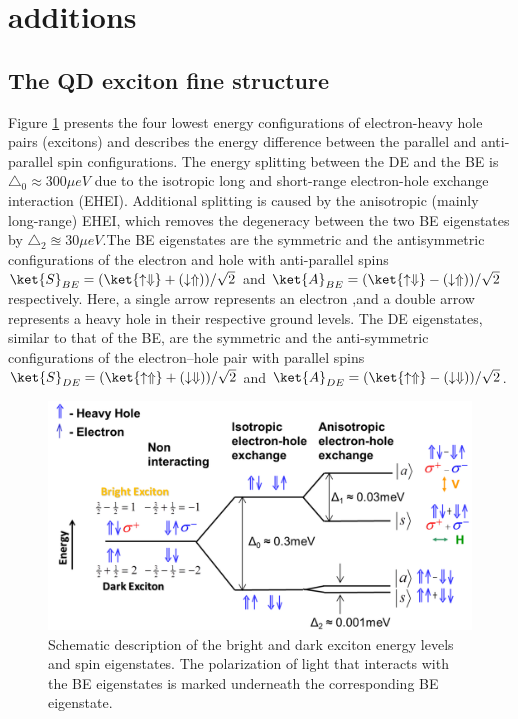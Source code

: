 \section{additions}
\subsection{The QD exciton fine structure}
Figure \ref{fig:energy_structure}  presents the four lowest energy configurations of electron-heavy hole pairs (excitons) and describes the energy difference between the parallel and anti-parallel spin configurations. The energy splitting between the DE and the BE is $\triangle_0 \approx 300 \mu eV$ due to the isotropic long and short-range electron-hole exchange interaction (EHEI). Additional splitting is caused by the anisotropic (mainly long-range) EHEI, which removes the degeneracy between the two BE eigenstates by $\triangle_2 \approxeq 30 \mu eV $.The BE eigenstates are the symmetric and the antisymmetric configurations of the electron and hole with anti-parallel spins $ \ket{S}_{BE} = (\ket{\uparrow\Downarrow}+(\downarrow\Uparrow))/\sqrt{2}$ and  $ \ket{A}_{BE} = (\ket{\uparrow\Downarrow}-(\downarrow\Uparrow))/\sqrt{2}$ respectively. Here, a single arrow represents an electron ,and a double arrow represents a heavy hole in their respective ground levels. The DE eigenstates, similar to that of the BE, are the symmetric and the anti-symmetric configurations of the electron–hole pair with parallel spins $ \ket{S}_{DE} = (\ket{\uparrow\Uparrow}+(\downarrow\Downarrow))/\sqrt{2}$ and $ \ket{A}_{DE} = (\ket{\uparrow\Uparrow}-(\downarrow\Downarrow))/\sqrt{2}$.
\begin{figure}[H]
	\centering
	\includegraphics[scale=0.32]{figures/energy_structure.png}
	\caption{Schematic description of the bright and dark exciton energy levels and spin eigenstates. The polarization of light that interacts with the BE eigenstates is marked underneath the corresponding BE eigenstate.}
	\label{fig:energy_structure}
\end{figure}

